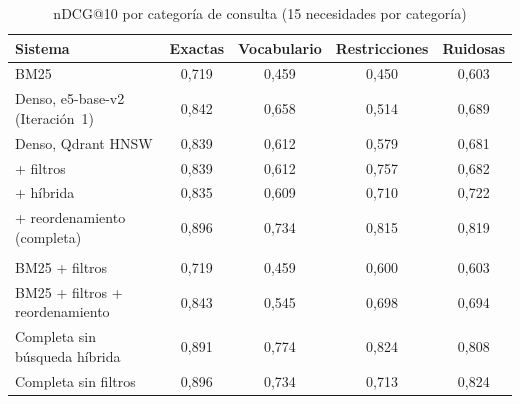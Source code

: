 \begin{table}[htbp!]
    \centering
    \caption{nDCG@10 por categoría de consulta (15 necesidades por categoría)}
    \label{tab:res-pe1-categoria}
    \small
    \begin{tabular}{|>{\raggedright\arraybackslash}p{4.6cm}|c|c|c|c|}
        \hline
        \textbf{Sistema} & \textbf{Exactas} & \textbf{Vocabulario} & \textbf{Restricciones} & \textbf{Ruidosas} \\
        \hline
        BM25 & 0{,}719 & 0{,}459 & 0{,}450 & 0{,}603 \\
        \hline
        Denso, e5-base-v2 (Iteración~1) & 0{,}842 & 0{,}658 & 0{,}514 & 0{,}689 \\
        \hline
        Denso, Qdrant HNSW & 0{,}839 & 0{,}612 & 0{,}579 & 0{,}681 \\
        \hline
        + filtros & 0{,}839 & 0{,}612 & 0{,}757 & 0{,}682 \\
        \hline
        + híbrida & 0{,}835 & 0{,}609 & 0{,}710 & 0{,}722 \\
        \hline
        + reordenamiento (completa) & 0{,}896 & 0{,}734 & 0{,}815 & 0{,}819 \\
        \hline
        \multicolumn{5}{|l|}{\textit{Sistemas complementarios}} \\
        \hline
        BM25 + filtros & 0{,}719 & 0{,}459 & 0{,}600 & 0{,}603 \\
        \hline
        BM25 + filtros + reordenamiento & 0{,}843 & 0{,}545 & 0{,}698 & 0{,}694 \\
        \hline
        Completa sin búsqueda híbrida & 0{,}891 & 0{,}774 & 0{,}824 & 0{,}808 \\
        \hline
        Completa sin filtros & 0{,}896 & 0{,}734 & 0{,}713 & 0{,}824 \\
        \hline
    \end{tabular}
\end{table}
